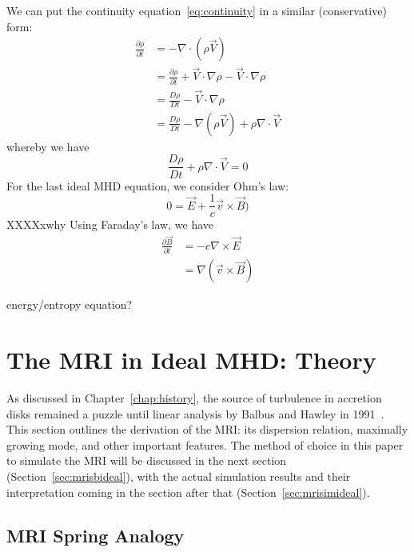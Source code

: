 We can put the continuity equation~\ref{eq:continuity} in a similar (conservative) form:
\begin{align}
  \frac{\partial\rho}{\partial t}&=-\nabla\cdot\left(\rho\vec V\right)\\
  &=\frac{\partial\rho}{\partial t}+\vec V\cdot\nabla\rho-\vec V\cdot\nabla\rho\\
  &=\frac{D\rho}{Dt}-\vec V\cdot\nabla\rho\\
  &=\frac{D\rho}{Dt}-\nabla\left(\rho\vec V\right)+\rho\nabla\cdot\vec V
\end{align}
whereby we have
\begin{equation}
  \frac{D\rho}{Dt}+\rho\nabla\cdot\vec V=0
\end{equation}
For the last ideal MHD equation, we consider Ohm's law:
\begin{equation}
  0=\vec E+\frac1c\vec v\times\vec B)
\end{equation}
XXXXxwhy
Using Faraday's law, we have
\begin{align}
  \frac{\partial\vec B}{\partial t}&=-c\nabla\times\vec E\\
  &=\nabla\left(\vec v\times\vec B\right)
\end{align}

energy/entropy equation? 

\section{The MRI in Ideal MHD: Theory}
As discussed in Chapter~\ref{chap:history}, the source of turbulence in accretion disks remained a puzzle until linear analysis by Balbus and Hawley in 1991~\cite{BH1991}. This section outlines the derivation of the MRI: its dispersion relation, maximally growing mode, and other important features. The method of choice in this paper to simulate the MRI will be discussed in the next section (Section~\ref{sec:mrisbideal}), with the actual simulation results and their interpretation coming in the section after that (Section~\ref{sec:mrisimideal}).

\subsection{MRI Spring Analogy}

